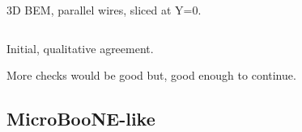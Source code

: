 \documentclass[xcolor=dvipsnames]{beamer}
\begin{document}
\begin{frame}
\begin{columns}
\begin{column}{0.5\textwidth}
\begin{center}
        \scriptsize 3D BEM, parallel wires, sliced at Y=0.
      \end{center}
    \end{column}
  \end{columns}

  \begin{center}\footnotesize
    Initial, qualitative agreement.  

    More checks would be good but, good enough to continue.
  \end{center}

\end{frame}


\subsection{MicroBooNE-like}
\end{document}
